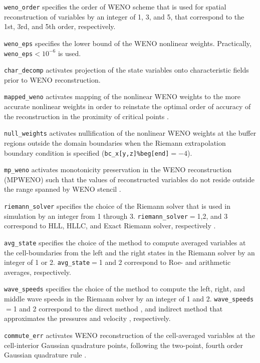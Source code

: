 \documentclass[11pt]{article}
\begin{document}
\texttt{weno\_order} specifies the order of WENO scheme that is used for spatial reconstruction of variables by an integer of 1, 3, and 5, that correspond to the 1st, 3rd, and 5th order, respectively.

\texttt{weno\_eps} specifies the lower bound of the WENO nonlinear weights. Practically, \texttt{weno\_eps}$<10^{-6}$ is used.

\texttt{char\_decomp} activates projection of the state variables onto characteristic fields prior to WENO reconstruction.

\texttt{mapped\_weno} activates mapping of the nonlinear WENO weights to the more accurate nonlinear weights in order to reinstate the optimal order of accuracy of the reconstruction in the proximity of critical points \citep{Henrick05}.

\texttt{null_weights} activates nullification of the nonlinear WENO weights at the buffer regions outside the domain boundaries when the Riemann extrapolation boundary condition is specified (\texttt{bc\_x[y,z]\%beg[end]}$=-4$).

\texttt{mp\_weno} activates monotonicity preservation in the WENO reconstruction (MPWENO) such that the values of reconstructed variables do not reside outside the range spanned by WENO stencil \citep{Suresh97,Balsara00}.

\texttt{riemann\_solver} specifies the choice of the Riemann solver that is used in simulation by an integer from 1 through 3. \texttt{riemann\_solver}$=$1,2, and 3 correspond to HLL, HLLC, and Exact Riemann solver, respectively \citep{Toro13}.

\texttt{avg\_state} specifies the choice of the method to compute averaged variables at the cell-boundaries from the left and the right states in the Riemann solver by an integer of 1 or 2. \texttt{avg\_state}$=$1 and 2 correspond to Roe- and arithmetic averages, respectively.

\texttt{wave\_speeds} specifies the choice of the method to compute the left, right, and middle wave speeds in the Riemann solver by an integer of 1 and 2.
\texttt{wave\_speeds}$=$1 and 2 correspond to the direct method \citep{Batten97}, and indirect method that approximates the pressures and velocity \citep{Toro13}, respectively.

\texttt{commute\_err} activates WENO reconstruction of the cell-averaged variables at the cell-interior Gaussian quadrature points, following the two-point, fourth order Gaussian quadrature rule \citep{Titarev04}.
\end{document}
